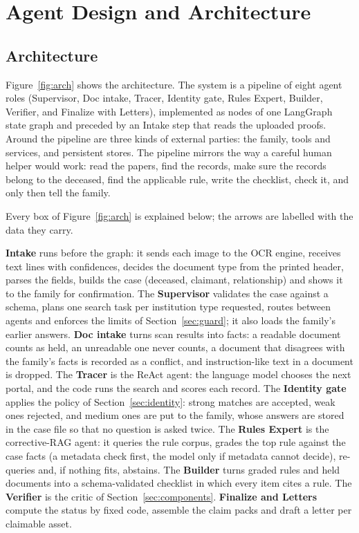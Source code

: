 \chapter{Agent Design and Architecture}\label{ch:design}
\section{Architecture}
Figure~\ref{fig:arch} shows the architecture. The system is a pipeline of eight agent roles (Supervisor, Doc intake, Tracer, Identity gate, Rules Expert, Builder, Verifier, and Finalize with Letters), implemented as nodes of one LangGraph state graph and preceded by an Intake step that reads the uploaded proofs. Around the pipeline are three kinds of external parties: the family, tools and services, and persistent stores. The pipeline mirrors the way a careful human helper would work: read the papers, find the records, make sure the records belong to the deceased, find the applicable rule, write the checklist, check it, and only then tell the family.



Every box of Figure~\ref{fig:arch} is explained below; the arrows are labelled with the data they carry.

\textbf{Intake} runs before the graph: it sends each image to the OCR engine, receives text lines with confidences, decides the document type from the printed header, parses the fields, builds the case (deceased, claimant, relationship) and shows it to the family for confirmation. The \textbf{Supervisor} validates the case against a schema, plans one search task per institution type requested, routes between agents and enforces the limits of Section~\ref{sec:guard}; it also loads the family's earlier answers. \textbf{Doc intake} turns scan results into facts: a readable document counts as held, an unreadable one never counts, a document that disagrees with the family's facts is recorded as a conflict, and instruction-like text in a document is dropped. The \textbf{Tracer} is the ReAct agent: the language model chooses the next portal, and the code runs the search and scores each record. The \textbf{Identity gate} applies the policy of Section~\ref{sec:identity}: strong matches are accepted, weak ones rejected, and medium ones are put to the family, whose answers are stored in the case file so that no question is asked twice. The \textbf{Rules Expert} is the corrective-RAG agent: it queries the rule corpus, grades the top rule against the case facts (a metadata check first, the model only if metadata cannot decide), re-queries and, if nothing fits, abstains. The \textbf{Builder} turns graded rules and held documents into a schema-validated checklist in which every item cites a rule. The \textbf{Verifier} is the critic of Section~\ref{sec:components}. \textbf{Finalize and Letters} compute the status by fixed code, assemble the claim packs and draft a letter per claimable asset.

